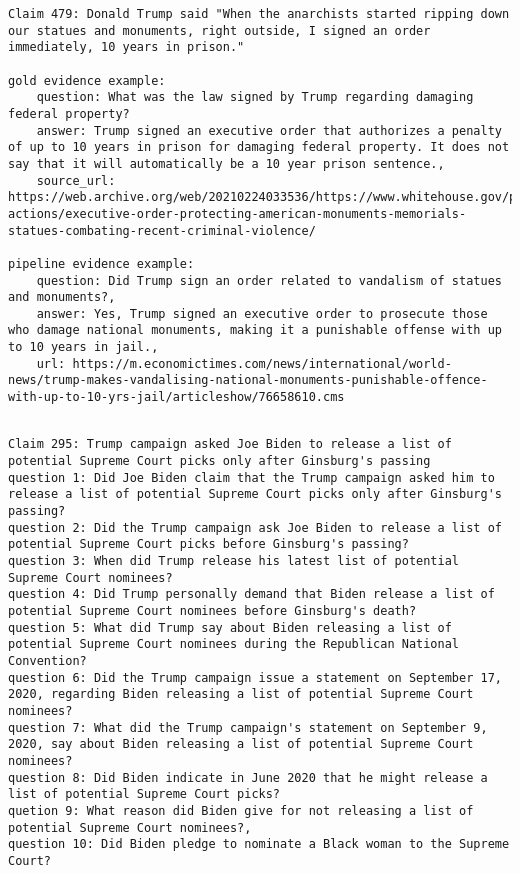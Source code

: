 \documentclass[oneside]{ctuthesis}
\theoremstyle{plain}
\theoremstyle{definition}
\theoremstyle{note}
\begin{document}
\begin{lstlisting}[caption={Example of a claim where our pipeline uses newspaper sources instead of official government sources.}, label={lst:gov_error}, breaklines=true, breakatwhitespace=false, columns=fullflexible]
Claim 479: Donald Trump said "When the anarchists started ripping down our statues and monuments, right outside, I signed an order immediately, 10 years in prison."

gold evidence example: 
    question: What was the law signed by Trump regarding damaging federal property?
    answer: Trump signed an executive order that authorizes a penalty of up to 10 years in prison for damaging federal property. It does not say that it will automatically be a 10 year prison sentence.,
    source_url: https://web.archive.org/web/20210224033536/https://www.whitehouse.gov/presidential-actions/executive-order-protecting-american-monuments-memorials-statues-combating-recent-criminal-violence/

pipeline evidence example: 
    question: Did Trump sign an order related to vandalism of statues and monuments?, 
    answer: Yes, Trump signed an executive order to prosecute those who damage national monuments, making it a punishable offense with up to 10 years in jail.,
    url: https://m.economictimes.com/news/international/world-news/trump-makes-vandalising-national-monuments-punishable-offence-with-up-to-10-yrs-jail/articleshow/76658610.cms
    
\end{lstlisting}

\begin{lstlisting}[caption={Example of a claim and questions showing that the last tends to be unrelated or redundant to fact-checking of the claim.}, label={lst:unrelated_questions}, breaklines=true, breakatwhitespace=false, columns=fullflexible]
Claim 295: Trump campaign asked Joe Biden to release a list of potential Supreme Court picks only after Ginsburg's passing
question 1: Did Joe Biden claim that the Trump campaign asked him to release a list of potential Supreme Court picks only after Ginsburg's passing?
question 2: Did the Trump campaign ask Joe Biden to release a list of potential Supreme Court picks before Ginsburg's passing?
question 3: When did Trump release his latest list of potential Supreme Court nominees?
question 4: Did Trump personally demand that Biden release a list of potential Supreme Court nominees before Ginsburg's death?
question 5: What did Trump say about Biden releasing a list of potential Supreme Court nominees during the Republican National Convention?
question 6: Did the Trump campaign issue a statement on September 17, 2020, regarding Biden releasing a list of potential Supreme Court nominees?
question 7: What did the Trump campaign's statement on September 9, 2020, say about Biden releasing a list of potential Supreme Court nominees?
question 8: Did Biden indicate in June 2020 that he might release a list of potential Supreme Court picks?
quetion 9: What reason did Biden give for not releasing a list of potential Supreme Court nominees?,
question 10: Did Biden pledge to nominate a Black woman to the Supreme Court?
    
\end{lstlisting}
\end{document}
